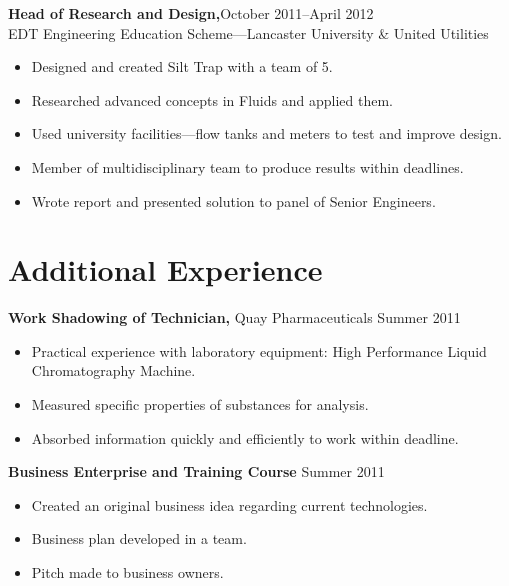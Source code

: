 \documentclass[margin]{res}
\begin{document}
\begin{resume}
\begin{itemize}
 \end{itemize}

 {\bf Head of Research and Design,}\hfill October 2011--April 2012\\ EDT Engineering Education Scheme---Lancaster University \& United Utilities 
 \begin{itemize} \itemsep -2pt  %
 \item Designed and created Silt Trap with a team of 5.
\item Researched advanced concepts in Fluids and applied them.
\item Used university facilities---flow tanks and meters to test and improve design.
\item Member of multidisciplinary team to produce results within deadlines.
 \item Wrote report and presented solution to panel of Senior Engineers.
 
 \end{itemize}


 \section{Additional Experience} 
{\bf Work Shadowing of Technician,} Quay Pharmaceuticals \hfill  Summer 2011
\begin{itemize} \itemsep -2pt %
\item Practical experience with laboratory equipment: High Performance Liquid Chromatography Machine.
\item Measured specific properties of substances for analysis.
\item Absorbed information quickly and efficiently to work within deadline.
\end{itemize}

{\bf Business Enterprise and Training Course} \hfill Summer 2011
\begin{itemize} \itemsep -2pt
\item Created an original business idea regarding current technologies.
\item Business plan developed in a team.
\item Pitch made to business owners.
\end{itemize}



\end{resume}
\end{document}
